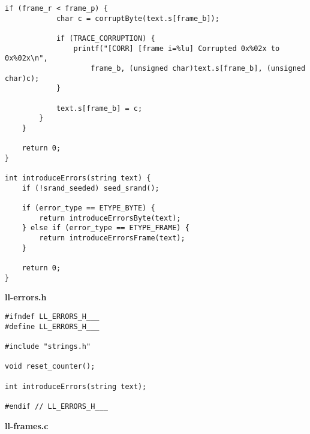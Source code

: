 \documentclass[subfiles]{main.tex}
\begin{document}
\begin{lstlisting}[style=rcom]
		if (frame_r < frame_p) {
			char c = corruptByte(text.s[frame_b]);
			
			if (TRACE_CORRUPTION) {
				printf("[CORR] [frame i=%lu] Corrupted 0x%02x to 0x%02x\n",
					frame_b, (unsigned char)text.s[frame_b], (unsigned char)c);
			}
			
			text.s[frame_b] = c;
		}
	}
	
	return 0;
}

int introduceErrors(string text) {
	if (!srand_seeded) seed_srand();
	
	if (error_type == ETYPE_BYTE) {
		return introduceErrorsByte(text);
	} else if (error_type == ETYPE_FRAME) {
		return introduceErrorsFrame(text);
	}
	
	return 0;
}
\end{lstlisting}

{\Large\textbf{ll-errors.h}}

\begin{lstlisting}[style=rcom]
#ifndef LL_ERRORS_H___
#define LL_ERRORS_H___

#include "strings.h"

void reset_counter();

int introduceErrors(string text);

#endif // LL_ERRORS_H___
\end{lstlisting}

{\Large\textbf{ll-frames.c}}
\end{document}
